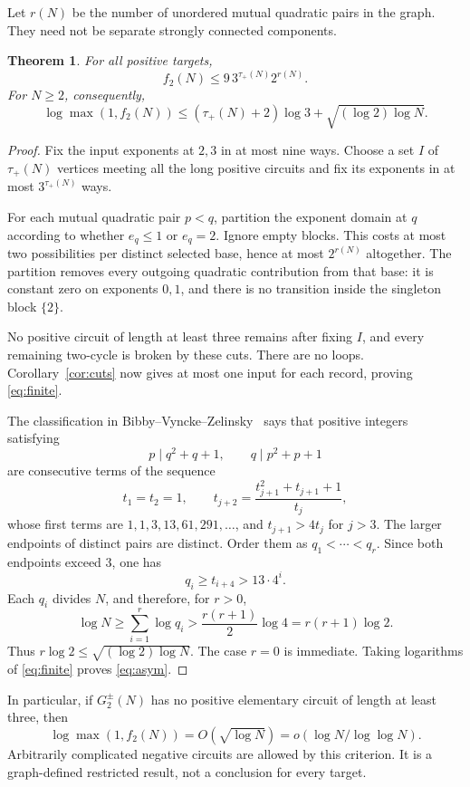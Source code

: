\documentclass[11pt]{article}
\newtheorem{theorem}{Theorem}[section]
\begin{document}
Let $r(N)$ be the number of unordered mutual quadratic pairs in the graph. They need not be separate strongly connected components.

\begin{theorem}\label{thm:graphbound}
For all positive targets,
\begin{equation}\label{eq:finite}
 \boxed{f_2(N)\le 9\,3^{\tau_+(N)}2^{r(N)}.}
\end{equation}
For $N\ge2$, consequently,
\begin{equation}\label{eq:asym}
 \boxed{\log\max(1,f_2(N))\le
 (\tau_+(N)+2)\log3+\sqrt{(\log2)\log N}.}
\end{equation}
\end{theorem}
\begin{proof}
Fix the input exponents at $2,3$ in at most nine ways. Choose a set $I$ of $\tau_+(N)$ vertices meeting all the long positive circuits and fix its exponents in at most $3^{\tau_+(N)}$ ways.

For each mutual quadratic pair $p<q$, partition the exponent domain at $q$ according to whether $e_q\le1$ or $e_q=2$. Ignore empty blocks. This costs at most two possibilities per distinct selected base, hence at most $2^{r(N)}$ altogether. The partition removes every outgoing quadratic contribution from that base: it is constant zero on exponents $0,1$, and there is no transition inside the singleton block $\{2\}$.

No positive circuit of length at least three remains after fixing $I$, and every remaining two-cycle is broken by these cuts. There are no loops. Corollary~\ref{cor:cuts} now gives at most one input for each record, proving \eqref{eq:finite}.

The classification in Bibby--Vyncke--Zelinsky~\cite[Lemma 5]{bibby} says that positive integers satisfying
\[
 p\mid q^2+q+1,\qquad q\mid p^2+p+1
\]
are consecutive terms of the sequence
\[
 t_1=t_2=1,\qquad
 t_{j+2}=\frac{t_{j+1}^2+t_{j+1}+1}{t_j},
\]
whose first terms are $1,1,3,13,61,291,\ldots$, and $t_{j+1}>4t_j$ for $j>3$.
The larger endpoints of distinct pairs are distinct. Order them as $q_1<\cdots<q_r$. Since both endpoints exceed $3$, one has
\[
 q_i\ge t_{i+4}>13\cdot4^i.
\]
Each $q_i$ divides $N$, and therefore, for $r>0$,
\[
 \log N\ge\sum_{i=1}^r\log q_i>
 \frac{r(r+1)}2\log4=r(r+1)\log2.
\]
Thus $r\log2\le\sqrt{(\log2)\log N}$. The case $r=0$ is immediate. Taking logarithms of \eqref{eq:finite} proves \eqref{eq:asym}.
\end{proof}

In particular, if $G_2^\pm(N)$ has no positive elementary circuit of length at least three, then
\[
 \log\max(1,f_2(N))=O(\sqrt{\log N})
 =o(\log N/\log\log N).
\]
Arbitrarily complicated negative circuits are allowed by this criterion. It is a graph-defined restricted result, not a conclusion for every target.
\end{document}
